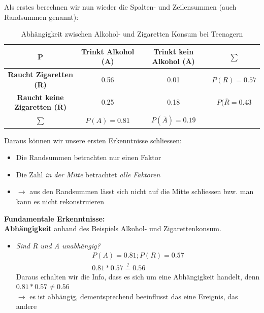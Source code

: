 \documentclass[a4paper]{article}
\theoremstyle{definition}
\theoremstyle{example}
\begin{document}
Als erstes berechnen wir nun wieder die Spalten- und Zeilensummen (auch Randsummen genannt):\\
\begin{table}[h!]
	\begin{center}
		\caption{Abhängigkeit zwischen Alkohol- und Zigaretten Konsum bei Teenagern}
		\label{tab: table1}
		\begin{tabular}{c|c|c|c}
			\textbf{P} & \textbf{Trinkt Alkohol (A)} & \textbf{Trinkt kein Alkohol ($\mathbf{\bar{A}}$)} & \textbf{$\sum$}\\
			\hline
			\textbf{Raucht Zigaretten (R)} & 0.56 & 0.01 & $P(R) = 0.57$\\
			\textbf{Raucht keine Zigaretten ($\mathbf{\bar{R}}$)} & 0.25 & 0.18 & $P(\bar{R} = 0.43$\\
			\textbf{$\sum$} & $P(A) = 0.81$ & $P(\bar{A}) = 0.19$\\
		\end{tabular}
	\end{center}
\end{table}
Daraus können wir unsere ersten Erkenntnisse schliessen:\\
\begin{itemize}
	\item Die Randsummen betrachten nur einen Faktor
	\item Die Zahl \textit{in der Mitte} betrachtet \textit{alle Faktoren}
	\item $\rightarrow$ aus den Randsummen lässt sich nicht auf die Mitte schliessen bzw. man kann es nicht rekonstruieren
\end{itemize}
\textbf{Fundamentale Erkenntnisse:}\\
\textbf{Abhängigkeit} anhand des Beispiels Alkohol- und Zigarettenkonsum.
\begin{itemize}
	\item {
	\textit{Sind R und A unabhängig?}
	\begin{equation}
	\begin{split}
		P(A) = 0.81 ; P(R) = 0.57 \\
		0.81 * 0.57 \stackrel{?}{=} 0.56
	\end{split}
	\end{equation}
	Daraus erhalten wir die Info, dass es sich um eine Abhängigkeit handelt, denn $0.81 * 0.57 \neq 0.56$ \\
	$\rightarrow$ es ist abhängig, dementsprechend beeinflusst das eine Ereignis, das andere
	}
\end{itemize}
\end{document}
